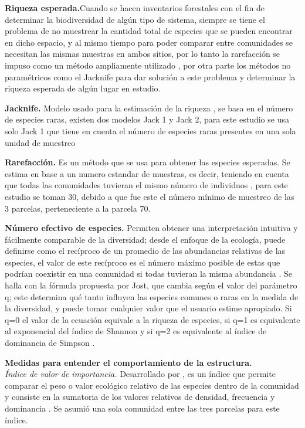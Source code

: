 \documentclass[conference,final,12pt,]{IEEEtran}
\begin{document}
\textbf{Riqueza esperada.}Cuando se hacen inventarios forestales con el
fin de determinar la biodiversidad de algún tipo de sistema, siempre se
tiene el problema de no muestrear la cantidad total de especies que se
pueden encontrar en dicho espacio, y al mismo tiempo para poder comparar
entre comunidades se necesitan las mismas muestras en ambos sitios, por
lo tanto la rarefacción se impuso como un método ampliamente utilizado
\citep{Z}, por otra parte los métodos no paramétricos como el Jacknife
\citep{AA} para dar solución a este problema y determinar la riqueza
esperada de algún lugar en estudio.

\textbf{Jacknife.} Modelo usado para la estimación de la riqueza \citep{X}, se
basa en el número de especies raras, existen dos modelos Jack 1 y Jack
2, para este estudio se usa solo Jack 1 que tiene en cuenta el número de
especies raras presentes en una sola unidad de muestreo \citep{Y} 

\textbf{Rarefacción.} Es un método que se usa para obtener las especies
esperadas. Se estima en base a un numero estandar de muestras, es decir,
teniendo en cuenta que todas las comunidades tuvieran el mismo número de
individuos \citep{B}, para este estudio se toman 30, debido a
que fue este el número mínimo de muestreo de las 3 parcelas, perteneciente
a la parcela 70.

\textbf{Número efectivo de especies.} Permiten obtener una interpretación
intuitiva y fácilmente comparable de la diversidad\citep{V};
desde el enfoque de la ecología, puede definirse como el
recíproco de un promedio de las abundancias relativas de las especies,
el valor de este recíproco es el número máximo posible de estas que
podrían coexistir en una comunidad si todas tuvieran la misma
abundancia \citep{W}. Se halla con la fórmula propuesta por Jost, que
cambia según el valor del parámetro q; este determina qué tanto influyen las
especies comunes o raras en la medida de la diversidad, y
puede tomar cualquier valor que el usuario estime apropiado. Si q=0 el
valor de la ecuación equivale a la riqueza de especies, si q=1 es
equivalente al exponencial del índice de Shannon y si q=2 es
equivalente al índice de dominancia de Simpson \citep{AV}.

\textbf{Medidas para entender el comportamiento de la estructura.} \\
\emph{Índice de valor de importancia.} Desarrollado por 
\cite{T}, es un índice que permite comparar el peso o valor ecológico
relativo de las especies dentro de la comunidad y consiste en la
sumatoria de los valores relativos de densidad, frecuencia y
dominancia \citep{U}. Se asumió una sola comunidad entre las tres
parcelas para este índice.
\end{document}
